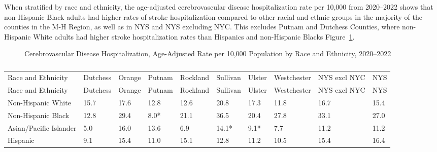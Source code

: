 \documentclass[
  english,
  letterpaper,
]{report}
\begin{document}
When stratified by race and ethnicity, the age-adjusted cerebrovascular
disease hospitalization rate per 10,000 from 2020--2022 shows that
non-Hispanic Black adults had higher rates of stroke hospitalization
compared to other racial and ethnic groups in the majority of the
counties in the M-H Region, as well as in NYS and NYS excluding NYC.
This excludes Putnam and Dutchess Counties, where non-Hispanic White
adults had higher stroke hospitalization rates than Hispanics and
non-Hispanic Blacks Figure~\ref{fig-cerebrovasdz-hospital-rande-aar}.

\begin{figure}


\caption{\label{fig-cerebrovasdz-hospital-rande-aar}Cerebrovascular
Disease Hospitalization, Age-Adjusted Rate per 10,000 Population by Race
and Ethnicity, 2020--2022}

\end{figure}%

\begin{longtable}[]{@{}llllllllll@{}}

\caption{\label{tbl-cerebrovasdz-hospital-rande-aar}Cerebrovascular
Disease Hospitalization, Age-Adjusted Rate per 10,000 Population by Race
and Ethnicity, 2020--2022}

\tabularnewline

\caption{}\label{T_75e74}\tabularnewline
\toprule\noalign{}
Race and Ethnicity & Dutchess & Orange & Putnam & Rockland & Sullivan &
Ulster & Westchester & NYS excl NYC & NYS \\
\midrule\noalign{}
\endfirsthead
\toprule\noalign{}
Race and Ethnicity & Dutchess & Orange & Putnam & Rockland & Sullivan &
Ulster & Westchester & NYS excl NYC & NYS \\
\midrule\noalign{}
\endhead
\bottomrule\noalign{}
\endlastfoot
Non-Hispanic White & 15.7 & 17.6 & 12.8 & 12.6 & 20.8 & 17.3 & 11.8 &
16.7 & 15.4 \\
Non-Hispanic Black & 12.8 & 29.4 & 8.0* & 21.1 & 36.5 & 20.4 & 27.8 &
33.1 & 27.0 \\
Asian/Pacific Islander & 5.0 & 16.0 & 13.6 & 6.9 & 14.1* & 9.1* & 7.7 &
11.2 & 11.2 \\
Hispanic & 9.1 & 15.4 & 11.0 & 15.1 & 12.8 & 11.2 & 10.5 & 15.4 &
16.4 \\

\end{longtable}
\end{document}
